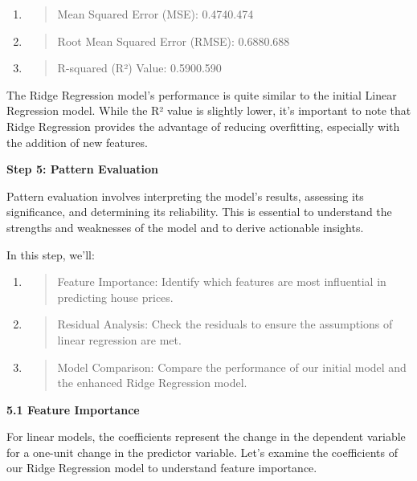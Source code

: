 \documentclass[]{article}
\newcommand{\textcenter}[1]{\begin{center} \vspace{10px}\textbf{\large #1} \end{center}}
\begin{document}
\begin{enumerate}
\def\labelenumi{\arabic{enumi}.}
\item
  \begin{quote}
  Mean Squared Error (MSE): 0.4740.474
  \end{quote}
\item
  \begin{quote}
  Root Mean Squared Error (RMSE): 0.6880.688
  \end{quote}
\item
  \begin{quote}
  R-squared (R²) Value: 0.5900.590
  \end{quote}
\end{enumerate}

The Ridge Regression model's performance is quite similar to the initial
Linear Regression model. While the R² value is slightly lower, it's
important to note that Ridge Regression provides the advantage of
reducing overfitting, especially with the addition of new features.

\textcenter{Step 5: Pattern Evaluation}

Pattern evaluation involves interpreting the model's results, assessing
its significance, and determining its reliability. This is essential to
understand the strengths and weaknesses of the model and to derive
actionable insights.

In this step, we'll:

\begin{enumerate}
\def\labelenumi{\arabic{enumi}.}
\item
  \begin{quote}
  Feature Importance: Identify which features are most influential in
  predicting house prices.
  \end{quote}
\item
  \begin{quote}
  Residual Analysis: Check the residuals to ensure the assumptions of
  linear regression are met.
  \end{quote}
\item
  \begin{quote}
  Model Comparison: Compare the performance of our initial model and the
  enhanced Ridge Regression model.
  \end{quote}
\end{enumerate}

\textbf{5.1 Feature Importance}

For linear models, the coefficients represent the change in the
dependent variable for a one-unit change in the predictor variable.
Let's examine the coefficients of our Ridge Regression model to
understand feature importance.
\end{document}
